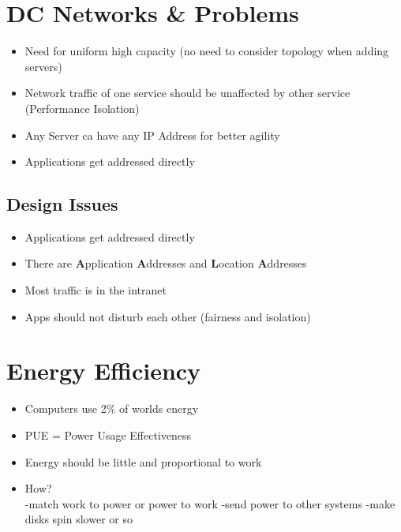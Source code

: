 \documentclass[a4paper]{article}
\begin{document}
\section{DC Networks \& Problems}
\begin{itemize}
\setlength{\itemsep}{-4pt}
\item Need for uniform high capacity (no need to consider topology when adding servers)
\item Network traffic of one service should be unaffected by other service (Performance Isolation)
\item Any Server ca have any IP Address for better agility

\item Applications get addressed directly
\end{itemize}

\subsection{Design Issues}
\begin{itemize}
\setlength{\itemsep}{-4pt}
\item Applications get addressed directly
\item There are {\bf A}pplication {\bf A}ddresses and {\bf L}ocation {\bf A}ddresses
\item Most traffic is in the intranet
\item Apps should not disturb each other (fairness and isolation)
\end{itemize}

\section{Energy Efficiency}
\begin{itemize}
\setlength{\itemsep}{-4pt}
\item Computers use 2\% of worlds energy
\item PUE = Power Usage Effectiveness
\item Energy should be little and proportional to work
\item How?\\
	-match work to power or power to work
	-send power to other systems
	-make disks spin slower or so
\end{itemize}
\end{document}
